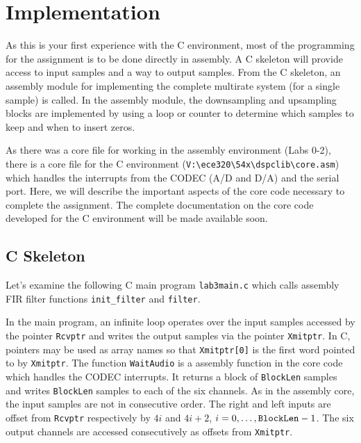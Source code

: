 \section{Implementation}

As this is your first experience with the C environment, most of 
the programming for the assignment is to 
be done directly in assembly.  A C skeleton 
will provide access to input samples and a way to output samples.  
From the C skeleton, an assembly module for implementing the 
complete multirate system (for a single sample) is called.  In the 
assembly module, the downsampling and upsampling blocks are 
implemented by using a loop or counter to determine which samples 
to keep and when to insert zeros.

As there was a core file for working in the assembly environment
(Labs 0-2), there is a core file for the C environment 
(\verb+V:\ece320\54x\dspclib\core.asm+)
which handles the interrupts from the 
CODEC (A/D and D/A) and the serial port.  Here, we will describe the 
important aspects of the core code necessary to complete the assignment.  
The complete documentation on the core code developed for the C 
environment will be made available soon.  

\subsection{C Skeleton}
Let's examine the following C main program \verb+lab3main.c+ which 
calls assembly FIR filter functions \verb+init_filter+ and 
\verb+filter+.
\setlength{\baselineskip}{0.39cm}
\setlength{\parskip}{0.4cm}
\setlength{\baselineskip}{0.5cm}
\setlength{\parskip}{0.5cm}

In the main program, an infinite loop operates over the input samples 
accessed by the pointer \verb+Rcvptr+ and writes the output samples 
via the pointer \verb+Xmitptr+.  In C, pointers may be used as array names 
so that \verb+Xmitptr[0]+ is the first word pointed to by \verb+Xmitptr+.  
The function \verb+WaitAudio+ is a assembly function in the core code 
which handles the CODEC interrupts.  It returns a block of \verb+BlockLen+
samples and writes \verb+BlockLen+ samples to each of the six 
channels.  As in the assembly core, the input samples are not in 
consecutive order.  The right and left inputs are offset from 
\verb+Rcvptr+ respectively by $4i$ and $4i+2$, 
$i=0,\ldots,\verb+BlockLen+-1$.  The six output channels are accessed 
consecutively as offsets from \verb+Xmitptr+.

